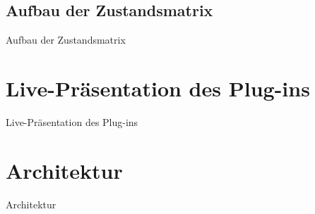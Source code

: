 \documentclass{beamer}
\begin{document}
\subsection{Aufbau der Zustandsmatrix}
\begin{frame}{Aufbau der Zustandsmatrix}
\end{frame}

\section{Live-Präsentation des Plug-ins}
\begin{frame}{Live-Präsentation des Plug-ins}
\end{frame}

\section{Architektur}
\begin{frame}{Architektur}
\end{frame}
\end{document}
